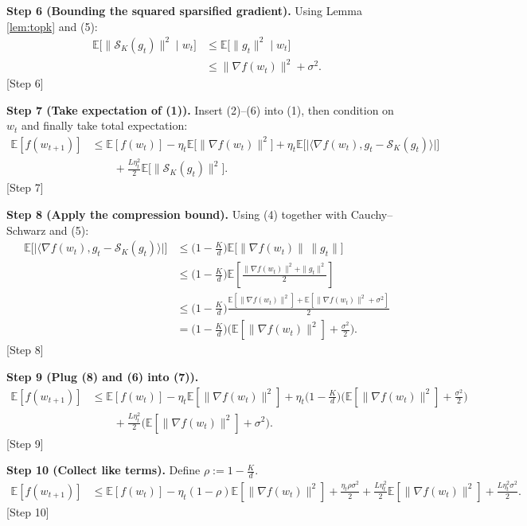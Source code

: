 \documentclass{article}
\newcommand{\topk}[1]{\mathcal{S}_K(#1)} %
\newcommand{\E}{\mathbb{E}}
\begin{document}
\noindent\textbf{Step 6 (Bounding the squared sparsified gradient).}  
Using Lemma \ref{lem:topk} and (5):
\begin{align}
\E\big[\|\topk{g_t}\|^{2}\mid w_t\big]
&\le \E\big[\|g_t\|^{2}\mid w_t\big] \nonumber\\
&\le \|\nabla f(w_t)\|^{2}+\sigma^{2}. \tag{6}
\end{align}
[Step 6]

\noindent\textbf{Step 7 (Take expectation of (1)).}  
Insert (2)–(6) into (1), then condition on $w_t$ and finally take total expectation:
\begin{align}
\E[f(w_{t+1})] 
&\le \E[f(w_t)] 
   -\eta_t \E\big[\|\nabla f(w_t)\|^{2}\big] 
   +\eta_t \E\Big[\big|\langle\nabla f(w_t),g_t-\topk{g_t}\rangle\big|\Big] \nonumber\\
&\qquad +\frac{L\eta_t^{2}}{2}\E\big[\|\topk{g_t}\|^{2}\big]. \tag{7}
\end{align}
[Step 7]

\noindent\textbf{Step 8 (Apply the compression bound).}  
Using (4) together with Cauchy–Schwarz and (5):
\begin{align}
\E\Big[\big|\langle\nabla f(w_t),g_t-\topk{g_t}\rangle\big|\Big]
&\le \Big(1-\frac{K}{d}\Big)\E\big[\|\nabla f(w_t)\|\,\|g_t\|\big] \nonumber\\
&\le \Big(1-\frac{K}{d}\Big)\E\!\left[\frac{\|\nabla f(w_t)\|^{2}+\|g_t\|^{2}}{2}\right] \nonumber\\
&\le \Big(1-\frac{K}{d}\Big)\frac{ \E[\|\nabla f(w_t)\|^{2}]
                                 +\E[\|\nabla f(w_t)\|^{2}+\sigma^{2}] }{2} \nonumber\\
&= \Big(1-\frac{K}{d}\Big)\Big(\E[\|\nabla f(w_t)\|^{2}]+\frac{\sigma^{2}}{2}\Big). \tag{8}
\end{align}
[Step 8]

\noindent\textbf{Step 9 (Plug (8) and (6) into (7)).}
\begin{align}
\E[f(w_{t+1})] 
&\le \E[f(w_t)]
   -\eta_t \E[\|\nabla f(w_t)\|^{2}]
   +\eta_t\Big(1-\frac{K}{d}\Big)\Big(\E[\|\nabla f(w_t)\|^{2}]+\frac{\sigma^{2}}{2}\Big) \nonumber\\
&\qquad +\frac{L\eta_t^{2}}{2}\Big(\E[\|\nabla f(w_t)\|^{2}]+\sigma^{2}\Big). \tag{9}
\end{align}
[Step 9]

\noindent\textbf{Step 10 (Collect like terms).}
Define $\rho:=1-\frac{K}{d}$.
\begin{align}
\E[f(w_{t+1})] 
&\le \E[f(w_t)]
   -\eta_t(1-\rho)\E[\|\nabla f(w_t)\|^{2}]
   +\frac{\eta_t\rho\sigma^{2}}{2}
   +\frac{L\eta_t^{2}}{2}\E[\|\nabla f(w_t)\|^{2}]
   +\frac{L\eta_t^{2}\sigma^{2}}{2}. \tag{10}
\end{align}
[Step 10]
\end{document}
